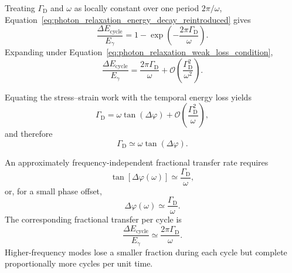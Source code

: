 Treating \(\Gamma_{\mathrm D}\) and \(\omega\) as locally constant over one
period \(2\pi/\omega\),
Equation~\eqref{eq:photon_relaxation_energy_decay_reintroduced} gives
\begin{equation}
    \frac{
        \Delta E_{\mathrm{cycle}}
    }{
        E_\gamma
    }
    =
    1
    -
    \exp
    \left(
        -
        \frac{
            2\pi\Gamma_{\mathrm D}
        }{
            \omega
        }
    \right).
    \label{eq:photon_relaxation_exact_cycle_decay}
\end{equation}
Expanding under
Equation~\eqref{eq:photon_relaxation_weak_loss_condition},
\begin{equation}
    \frac{
        \Delta E_{\mathrm{cycle}}
    }{
        E_\gamma
    }
    =
    \frac{
        2\pi\Gamma_{\mathrm D}
    }{
        \omega
    }
    +
    \mathcal{O}
    \left(
        \frac{
            \Gamma_{\mathrm D}^{2}
        }{
            \omega^{2}
        }
    \right).
    \label{eq:photon_relaxation_cycle_decay_expansion}
\end{equation}

Equating the stress--strain work with the temporal energy loss yields
\begin{equation}
    \Gamma_{\mathrm D}
    =
    \omega
    \tan
    \left(
        \Delta\varphi
    \right)
    +
    \mathcal{O}
    \left(
        \frac{
            \Gamma_{\mathrm D}^{2}
        }{
            \omega
        }
    \right),
    \label{eq:photon_relaxation_gamma_phase_relation}
\end{equation}
and therefore
\begin{equation}
    \Gamma_{\mathrm D}
    \simeq
    \omega
    \tan
    \left(
        \Delta\varphi
    \right).
    \label{eq:photon_relaxation_gamma_phase_leading}
\end{equation}

An approximately frequency-independent fractional transfer rate requires
\begin{equation}
    \tan
    \left[
        \Delta\varphi(\omega)
    \right]
    \simeq
    \frac{
        \Gamma_{\mathrm D}
    }{
        \omega
    },
    \label{eq:photon_relaxation_inverse_frequency_phase_lag}
\end{equation}
or, for a small phase offset,
\begin{equation}
    \Delta\varphi(\omega)
    \simeq
    \frac{
        \Gamma_{\mathrm D}
    }{
        \omega
    }.
    \label{eq:photon_relaxation_small_phase_lag}
\end{equation}
The corresponding fractional transfer per cycle is
\begin{equation}
    \frac{
        \Delta E_{\mathrm{cycle}}
    }{
        E_\gamma
    }
    \simeq
    \frac{
        2\pi\Gamma_{\mathrm D}
    }{
        \omega
    }.
    \label{eq:photon_relaxation_cycle_loss_inverse_frequency}
\end{equation}
Higher-frequency modes lose a smaller fraction during each cycle but complete
proportionally more cycles per unit time.

